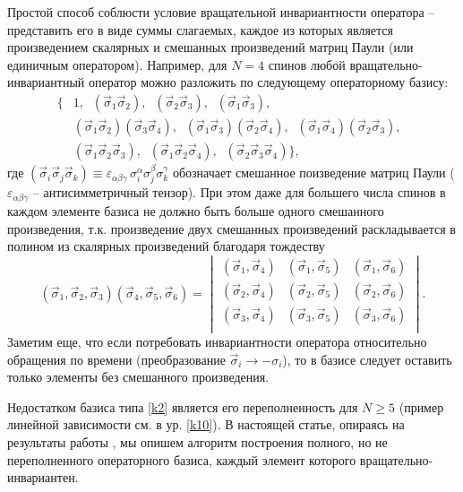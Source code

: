 \documentclass[]{article}
\renewcommand{\[}{\begin{equation}}
\renewcommand{\]}{\end{equation}}
\begin{document}
Простой способ соблюсти условие вращательной инвариантности оператора -- представить его в виде суммы слагаемых, каждое из которых является произведением скалярных и смешанных произведений матриц Паули (или единичным оператором). Например, для $N=4$ спинов любой вращательно-инвариантный оператор можно разложить по следующему операторному базису:
\begin{align}
\{ & 1,  \;\;({\vec \sigma}_1{\vec\sigma}_2), \;\; ({\vec \sigma}_2{\vec\sigma}_3), \;\;({\vec \sigma}_1{\vec\sigma}_3),\nonumber\\
&({\vec \sigma}_1{\vec\sigma}_2)({\vec \sigma}_3{\vec\sigma}_4),\;\;({\vec \sigma}_1{\vec\sigma}_3)({\vec \sigma}_2{\vec\sigma}_4),\;\;
({\vec \sigma}_1{\vec\sigma}_4)({\vec \sigma}_2{\vec\sigma}_3),\;\; \nonumber \\
&({\vec \sigma}_1{\vec\sigma}_2{\vec\sigma}_3),\;\;({\vec \sigma}_1{\vec\sigma}_2{\vec\sigma}_4),\;\;({\vec \sigma}_2{\vec\sigma}_3{\vec\sigma}_4)
\},
\label{k2}
\end{align}
где $({\vec \sigma}_i{\vec\sigma}_j{\vec\sigma}_k)\equiv \varepsilon_{\alpha \beta \gamma} \, \sigma_i^\alpha \sigma_j^\beta \sigma_k^\gamma$ обозначает смешанное поизведение матриц Паули ($ \varepsilon_{\alpha \beta \gamma}$  -- антисимметричный тензор). 
При этом даже для большего числа спинов в каждом элементе базиса не должно быть больше одного смешанного произведения, т.к. произведение двух смешанных произведений раскладывается в полином из скалярных произведений благодаря тождеству
\[
(\vec\sigma_1,\vec\sigma_2,\vec\sigma_3)
(\vec\sigma_4,\vec\sigma_5,\vec\sigma_6)=
\begin{vmatrix}
	(\vec\sigma_1,\vec\sigma_4) & 	(\vec\sigma_1,\vec\sigma_5) & (\vec\sigma_1,\vec\sigma_6) \\
	(\vec\sigma_2,\vec\sigma_4) & 	(\vec\sigma_2,\vec\sigma_5) & (\vec\sigma_2,\vec\sigma_6) \\
	(\vec\sigma_3,\vec\sigma_4) & 	(\vec\sigma_3,\vec\sigma_5) & (\vec\sigma_3,\vec\sigma_6) \\
\end{vmatrix}.
\label{k3}
\]
Заметим еще, что если потребовать инвариантности оператора относительно обращения по времени (преобразование $\vec\sigma_i\rightarrow -\sigma_i$), то в базисе следует оставить только элементы без смешанного произведения.


Недостатком базиса типа \eqref{k2} является его переполненность для $N\geq 5$ \cite{variational}(пример линейной зависимости см. в ур. \eqref{k10}).
В настоящей статье, опираясь на результаты работы \cite{sourceArticle}, мы опишем алгоритм построения полного, но не переполненного операторного базиса, каждый элемент которого вращательно-инвариантен.
\end{document}

